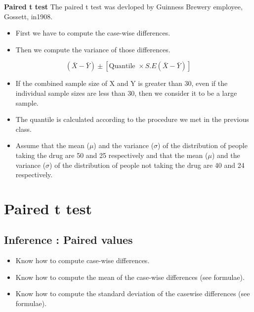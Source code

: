 
\textbf{Paired t test}
The paired t test was devloped by Guinness Brewery employee, Gossett, in1908.
\begin{itemize}
\item First we have to compute the case-wise differences.
\item Then we compute the variance of those differences.
\end{itemize}







\[ ( \bar{X} - \bar{Y} ) \pm \left[ \mbox{Quantile } \times S.E(\bar{X}-\bar{Y}) \right] \]
\begin{itemize}
\item If the combined sample size of X and Y is greater than 30, even if the individual sample sizes are less than 30, then we consider it to be a large sample.
\item The quantile is calculated according to the procedure we met in the previous class.
\end{itemize}

\begin{itemize}
\item Assume that the mean ($\mu$) and the variance ($\sigma$) of the distribution
of people taking the drug are 50 and 25 respectively and that the mean ($\mu$)
and the variance ($\sigma$) of the distribution of people not taking the drug are
40 and 24 respectively.
\end{itemize}









\section{Paired t test}

{
\subsection{Inference : Paired values}

\begin{itemize}

\item Know how to compute case-wise differences.
\item Know how to compute the mean of the case-wise differences (see formulae). 
\item Know how to compute the standard deviation of the casewise differences (see formulae).
\end{itemize} 
}



